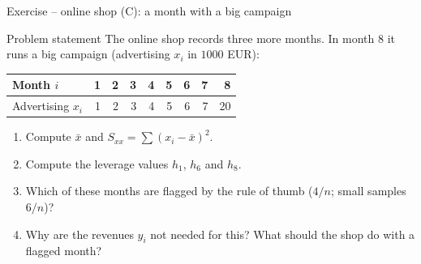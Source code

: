 \documentclass[aspectratio=169,11pt]{beamer}
\begin{document}
\begin{frame}{Exercise -- online shop (C): a month with a big campaign}
  \begin{block}{Problem statement}
    The online shop records three more months. In month 8 it runs a big
    campaign (advertising $x_i$ in $1000$ EUR):
    \begin{center}
      \renewcommand{\arraystretch}{1.1}
      \begin{tabular}{l*{8}{r}}
        \toprule
        Month $i$         & 1 & 2 & 3 & 4 & 5 & 6 & 7 & 8 \\
        \midrule
        Advertising $x_i$ & 1 & 2 & 3 & 4 & 5 & 6 & 7 & 20 \\
        \bottomrule
      \end{tabular}
    \end{center}
    \begin{enumerate}
      \setlength{\itemsep}{2pt}
      \item Compute $\bar{x}$ and $S_{xx} = \sum (x_i - \bar{x})^{2}$.
      \item Compute the leverage values $h_1$, $h_6$ and $h_8$.
      \item Which of these months are flagged by the rule of thumb
            ($4/n$; small samples $6/n$)?
      \item Why are the revenues $y_i$ not needed for this? What should the
            shop do with a flagged month?
    \end{enumerate}
  \end{block}
\end{frame}
\end{document}
